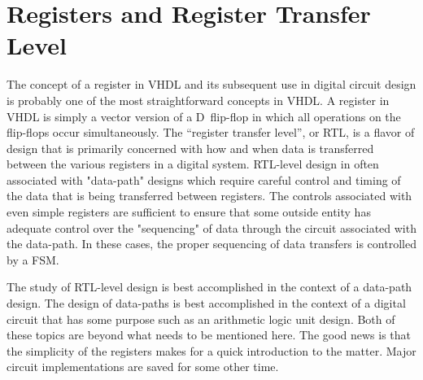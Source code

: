 %
%
\chapter{Registers and Register Transfer Level}
The concept of a register in VHDL and its subsequent use in digital circuit design is probably one of the most straightforward concepts in VHDL. A register in VHDL is simply a vector version of a D~flip-flop in which all operations on the flip-flops occur simultaneously. The ``register transfer level'', or RTL, is a flavor of design that is primarily concerned with how and when data is transferred between the various registers in a digital system. RTL-level design in often associated with "data-path" designs which require careful control and timing of the data that is being transferred between registers. The controls associated with even simple registers are sufficient to ensure that some outside entity has adequate control over the "sequencing" of data through the circuit associated with the data-path. In these cases, the proper sequencing of data transfers is controlled by a FSM.

The study of RTL-level design is best accomplished in the context of a data-path design. The design of data-paths is best accomplished in the context of a digital circuit that has some purpose such as an arithmetic logic unit design. Both of these topics are beyond what needs to be mentioned here. The good news is that the simplicity of the registers makes for a quick introduction to the matter. Major circuit implementations are saved for some other time.

